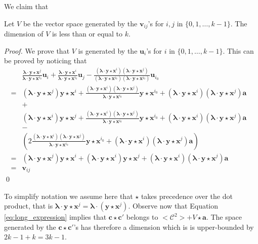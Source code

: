 \documentclass[runningheads,11pt]{llncs}
\newcommand{\code}[1]{\ensuremath{\mathscr{#1}}}
\newcommand{\CC}{\code{C}}
\newcommand{\sqc}[1]{<#1^2>}
\newcommand{\scp}[2]{#1\cdot #2}
\newcommand{\cwp}{\star}
\newcommand{\word}[1]{\ensuremath{\boldsymbol{#1}}}
\newcommand{\av}{\word{a}}
\newcommand{\lambdav}{\word{\lambda}}
\newcommand{\cv}{\word{c}}
\newcommand{\uv}{\word{u}}
\newcommand{\vv}{\word{v}}
\newcommand{\xv}{\word{x}}
\newcommand{\yv}{\word{y}}
\begin{document}
We claim that 
\begin{lemma}\label{lem:dimension}
Let $V$ be the vector space generated by the $\vv_{ij}$'s for $i,j$ in $\{0,1,\dots,k-1\}$.
The dimension of $V$ is less than or equal to $k$.
\end{lemma}
 \begin{proof}
 We prove that $V$ is generated by the $\uv_i$'s for $i$ in $\{0,1,\dots,k-1\}$.
 This can be proved by noticing that 
 \begin{eqnarray*}
 & \frac{\scp{\lambdav}{\yv \cwp \xv^j}}{\scp{\lambdav}{\yv \cwp \xv^{i_0}}}\uv_i
 + \frac{\scp{\lambdav}{\yv \cwp \xv^i}}{\scp{\lambdav}{\yv \cwp \xv^{i_0}}}\uv_j
 -\frac{(\scp{\lambdav}{\yv \cwp \xv^i})( \scp{\lambdav}{\yv \cwp \xv^j})}{(\scp{\lambdav}{\yv \cwp \xv^{i_0})}\scp{(\lambdav}{\yv \cwp \xv^{i_0})}} \uv_{i_0} &\\
 =&(\scp{\lambdav}{\yv \cwp \xv^{j}})\yv\cwp \xv^i +\frac{(\scp{\lambdav}{\yv \cwp \xv^{i}})(\scp{\lambdav}{\yv \cwp \xv^{j}})}{\scp{\lambdav}{\yv \cwp \xv^{i_0}}}\yv \cwp \xv^{i_0}+ (\scp{\lambdav}{\yv \cwp \xv^{i}})(\scp{\lambdav}{\yv \cwp \xv^{j}}) \av &\\
 &+ & \\
 & (\scp{\lambdav}{\yv \cwp \xv^{i}})\yv\cwp \xv^j +\frac{(\scp{\lambdav}{\yv \cwp \xv^{i}})(\scp{\lambdav}{\yv \cwp \xv^{j}})}{\scp{\lambdav}{\yv \cwp \xv^{i_0}}}\yv \cwp \xv^{i_0}+ (\scp{\lambdav}{\yv \cwp \xv^{i}})(\scp{\lambdav}{\yv \cwp \xv^{j}}) \av & \\
 & - &\\
 & \left(2\frac{(\scp{\lambdav}{\yv \cwp \xv^{i}})(\scp{\lambdav}{\yv \cwp \xv^{j}})}{\scp{\lambdav}{\yv \cwp \xv^{i_0}}}\yv \cwp \xv^{i_0}+ (\scp{\lambdav}{\yv \cwp \xv^{i}})(\scp{\lambdav}{\yv \cwp \xv^{j}}) \av \right) &\\
 =& (\scp{\lambdav}{\yv \cwp \xv^{j}})\yv\cwp \xv^i  + (\scp{\lambdav}{\yv \cwp \xv^{i}})\yv\cwp \xv^j + (\scp{\lambdav}{\yv \cwp \xv^{i}})(\scp{\lambdav}{\yv \cwp \xv^{j}}) \av & \\
 =&   \vv_{ij} &
 \end{eqnarray*}
 \qed
 \end{proof}
 To simplify notation we assume here that $\cwp$ takes precedence over the dot product, that is 
 $\scp{\lambdav}{\yv \cwp \xv^j}=\scp{\lambdav}{(\yv \cwp \xv^j)}$.
 Observe now that Equation \eqref{eq:long_expression} implies that 
 $\cv \cwp \cv'$ belongs to $ \sqc{\CC} + V \cwp \av$.
 The space generated by the $\cv \cwp \cv'$'s has therefore a dimension which is is upper-bounded by
 $2k-1 + k=3k-1$.
 
\end{document}
